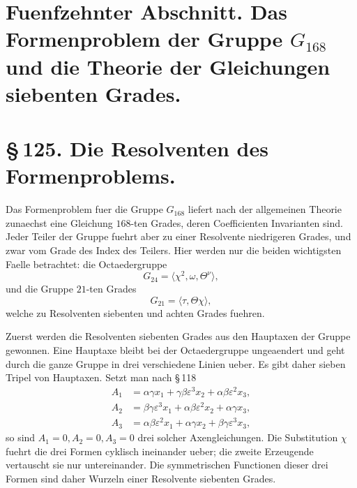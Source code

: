 \documentclass[11pt]{article}
\newcommand{\eps}{\varepsilon}
\begin{document}
\section*{Fuenfzehnter Abschnitt. Das Formenproblem der Gruppe \(G_{168}\) und die Theorie der Gleichungen siebenten Grades.}

\section*{\S\,125. Die Resolventen des Formenproblems.}

Das Formenproblem fuer die Gruppe \(G_{168}\) liefert nach der allgemeinen Theorie zunaechst eine Gleichung \(168\)-ten Grades, deren Coefficienten Invarianten sind. Jeder Teiler der Gruppe fuehrt aber zu einer Resolvente niedrigeren Grades, und zwar vom Grade des Index des Teilers. Hier werden nur die beiden wichtigsten Faelle betrachtet: die Octaedergruppe
\begin{equation}
G_{24}=\langle \chi^2,\omega,\Theta^\nu\rangle,
\tag{1}
\end{equation}
und die Gruppe \(21\)-ten Grades
\begin{equation}
G_{21}=\langle \tau,\Theta\chi\rangle,
\tag{2}
\end{equation}
welche zu Resolventen siebenten und achten Grades fuehren.

Zuerst werden die Resolventen siebenten Grades aus den Hauptaxen der Gruppe gewonnen. Eine Hauptaxe bleibt bei der Octaedergruppe ungeaendert und geht durch die ganze Gruppe in drei verschiedene Linien ueber. Es gibt daher sieben Tripel von Hauptaxen. Setzt man nach \S\,118
\begin{equation}
\begin{aligned}
A_1&=\alpha\gamma x_1+\gamma\beta\eps^3x_2+\alpha\beta\eps^2x_3,\\
A_2&=\beta\gamma\eps^3x_1+\alpha\beta\eps^2x_2+\alpha\gamma x_3,\\
A_3&=\alpha\beta\eps^2x_1+\alpha\gamma x_2+\beta\gamma\eps^3x_3,
\end{aligned}
\tag{3}
\end{equation}
so sind \(A_1=0,A_2=0,A_3=0\) drei solcher Axengleichungen. Die Substitution \(\chi\) fuehrt die drei Formen cyklisch ineinander ueber; die zweite Erzeugende vertauscht sie nur untereinander. Die symmetrischen Functionen dieser drei Formen sind daher Wurzeln einer Resolvente siebenten Grades.
\end{document}
